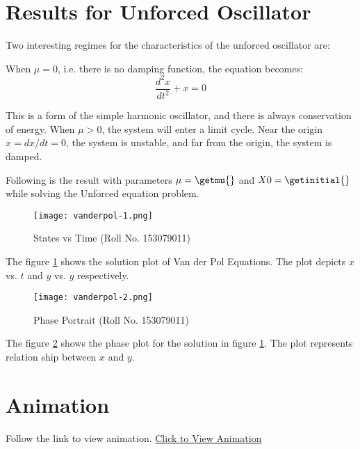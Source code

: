 \documentclass[12pt, a4paper]{article}
\begin{document}
\section{Results for Unforced Oscillator}
Two interesting regimes for the characteristics of the unforced oscillator are:

When $\mu = 0$, i.e. there is no damping function, the equation becomes:
\begin{equation} \label{simple}
\frac{d^2x}{dt^2} + x = 0
\end{equation}

This is a form of the simple harmonic oscillator, and there is always conservation of energy.
When $\mu > 0$, the system will enter a limit cycle. Near the origin $x = dx/dt = 0$, the system is unstable, and far from the origin, the system is damped.

Following is the result with parameters $\mu = \getmu{}$ and $X0 = \getinitial{}$ while solving the Unforced equation problem.
\begin{figure}[H]
\centering
\texttt{[image: vanderpol-1.png]}
\caption{States vs Time (Roll No. 153079011)}
\label{fig:states}
\end{figure}

The figure \ref{fig:states} shows the solution plot of Van der Pol Equations. The plot depicts $x$ vs. $t$ and $y$ vs. $y$ respectively.

\begin{figure}[H]
\centering
\texttt{[image: vanderpol-2.png]}
\caption{Phase Portrait (Roll No. 153079011)}
\label{fig:phase}
\end{figure}

The figure \ref{fig:phase} shows the phase plot for the solution in figure \ref{fig:states}. The plot represents relation ship between $x$ and $y$.

\section{Animation}
Follow the link to view animation.
\href{./153079011.html}{Click to View Animation}



\end{document}
